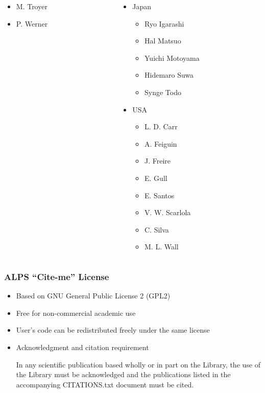 \begin{frame}
\begin{columns}[T]
\begin{column}{.31\textwidth}
\begin{itemize}
\begin{itemize}
        \item M. Troyer
        \item P. Werner
        \end{itemize}
      \end{itemize}
    \end{column}
    \begin{column}{.39\textwidth}
      \begin{itemize}
      \item Japan
        \begin{itemize}
        \item Ryo Igarashi
        \item Hal Matsuo
        \item Yuichi Motoyama
        \item Hidemaro Suwa
        \item Synge Todo
        \end{itemize}
      \item USA
        \begin{itemize}
        \item L. D. Carr
        \item A. Feiguin
        \item J. Freire
        \item E. Gull
        \item E. Santos
        \item V. W. Scarlola
        \item C. Silva
        \item M. L. Wall
        \end{itemize}
      \end{itemize}
    \end{column}
  \end{columns}
\end{frame}

\begin{frame}
\frametitle{ALPS ``Cite-me'' License}
  \begin{itemize}
  \item Based on GNU General Public License 2 (GPL2)
  \item Free for non-commercial academic use
  \item User’s code can be redistributed freely under the same license
  \item Acknowledgment and citation requirement
    \begin{minipage}{.9\textwidth}
    \begin{block}{}
      In any scientific publication based wholly or in part on the
      Library, the use of the Library must be acknowledged and the
      publications listed in the accompanying CITATIONS.txt document
      must be cited.
    \end{block}
    \end{minipage}
  \end{itemize}
\end{frame}

